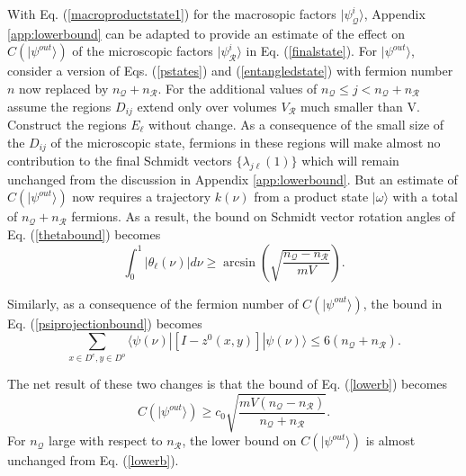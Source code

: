 \documentclass[12pt,amsmath,amssymb,onecolumn]{revtex4-2}
\begin{document}
With Eq. (\ref{macroproductstate1}) for the macrosopic factors $|\psi^i_{\mathcal{Q}} \rangle $,
Appendix \ref{app:lowerbound} can be adapted to provide an
estimate of the effect on $C( |\psi^{out} \rangle )$
of the microscopic factors $|\psi^i_{\mathcal{R}} \rangle $ in Eq. (\ref{finalstate}). 
For $|\psi^{out} \rangle $, consider a version of Eqs. (\ref{pstates}) and (\ref{entangledstate}) 
with fermion number $n$ now replaced by $n_{\mathcal{Q}} + n_{\mathcal{R}}$. 
For the additional values of $n_{\mathcal{Q}} \le j < n_{\mathcal{Q}} + n_{\mathcal{R}}$
assume the regions $D_{ij}$ extend only over volumes $V_{\mathcal{R}}$ much smaller than V.
Construct the regions $E_\ell$ without change.  As a consequence
of the small size of the $D_{ij}$ of the microscopic state, fermions in these
regions will make almost no contribution to the final Schmidt vectors
$\{\lambda_{j\ell} (1)\}$ which will remain unchanged from the discussion in 
Appendix \ref{app:lowerbound}.
But an estimate of 
$C( |\psi^{out} \rangle )$ now requires a trajectory $k(\nu)$ from a product state $|\omega \rangle $ with a total of
$n_{\mathcal{Q}} + n_{\mathcal{R}}$ fermions. As a result, the bound on Schmidt vector
rotation angles of Eq. (\ref{thetabound}) becomes
\begin{equation}
\label{thetaboundscattering}
\int_0^1 | \theta_{\ell}(\nu)| d \nu \ge \arcsin( \sqrt{\frac{n_{\mathcal{Q}} - n_{\mathcal{R}}}{mV}}).
\end{equation}

Similarly, as a consequence of the fermion number of $C( |\psi^{out} \rangle )$,
the bound in Eq. (\ref{psiprojectionbound}) becomes 
\begin{equation}
\label{psiprojectionboundscattering}
\sum_{x \in D^e, y \in D^o}  \langle \psi(\nu)| [I - z^0(x,y)]|\psi(\nu) \rangle  \le 6(n_{\mathcal{Q}} + n_{\mathcal{R}}).
\end{equation}

The net result of these two changes is that the bound of Eq. (\ref{lowerb}) becomes
\begin{equation}
\label{cbound1}
C( |\psi^{out} \rangle ) \ge c_0 \sqrt{ \frac{mV(n_{\mathcal{Q}} - n_{\mathcal{R}})}{n_{\mathcal{Q}} + n_{\mathcal{R}}}}.
\end{equation}
For $n_{\mathcal{Q}}$ large with respect to $n_{\mathcal{R}}$, the lower bound on 
$C( |\psi^{out} \rangle )$ is almost unchanged from Eq. (\ref{lowerb}). 
\end{document}
